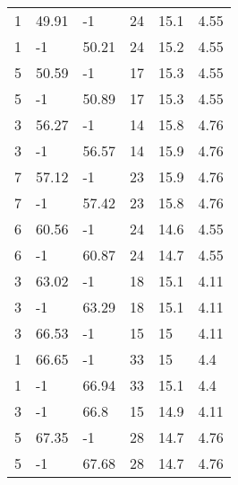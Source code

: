 \begin{table*}[h!]
\begin{tabular*}{\linewidth}{p{50pt}<{\centering}p{50pt}<{\centering}
p{60pt}<{\centering}p{60pt}<{\centering}p{60pt}<{\centering}p{70pt}<{\centering}}
1 & 49.91 & -1 & 24 & 15.1 & 4.55 \\
1 & -1 & 50.21 & 24 & 15.2 & 4.55 \\
5 & 50.59 & -1 & 17 & 15.3 & 4.55 \\
5 & -1 & 50.89 & 17 & 15.3 & 4.55 \\
3 & 56.27 & -1 & 14 & 15.8 & 4.76 \\
3 & -1 & 56.57 & 14 & 15.9 & 4.76 \\
7 & 57.12 & -1 & 23 & 15.9 & 4.76 \\
7 & -1 & 57.42 & 23 & 15.8 & 4.76 \\
6 & 60.56 & -1 & 24 & 14.6 & 4.55 \\
6 & -1 & 60.87 & 24 & 14.7 & 4.55 \\
3 & 63.02 & -1 & 18 & 15.1 & 4.11 \\
3 & -1 & 63.29 & 18 & 15.1 & 4.11 \\
3 & 66.53 & -1 & 15 & 15 & 4.11 \\
1 & 66.65 & -1 & 33 & 15 & 4.4 \\
1 & -1 & 66.94 & 33 & 15.1 & 4.4 \\
3 & -1 & 66.8 & 15 & 14.9 & 4.11 \\
5 & 67.35 & -1 & 28 & 14.7 & 4.76 \\
5 & -1 & 67.68 & 28 & 14.7 & 4.76 \\
\bottomrule
  \end{tabular*}
  \label{Ap3}
\end{table*}

\newpage

